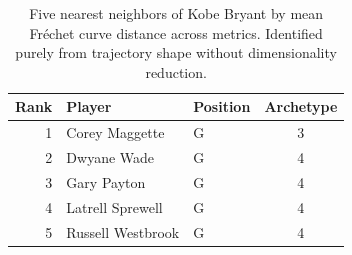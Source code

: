 \begin{table}[htbp]
  \centering\small
  \begin{tabular}{rllc}
    \toprule
    Rank & Player & Position & Archetype \\
    \midrule
    1 & Corey Maggette & G & 3 \\
    2 & Dwyane Wade & G & 4 \\
    3 & Gary Payton & G & 4 \\
    4 & Latrell Sprewell & G & 4 \\
    5 & Russell Westbrook & G & 4 \\
    \bottomrule
  \end{tabular}
  \caption{Five nearest neighbors of Kobe Bryant by mean Fr\'{e}chet curve distance across metrics. Identified purely from trajectory shape without dimensionality reduction.}
  \label{tab:Kobe_Bryant_frechet_curve_neighbors}
\end{table}

